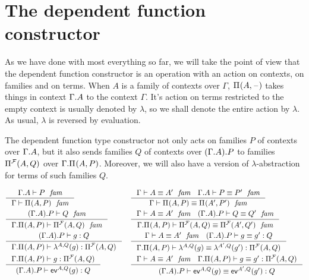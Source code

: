 \section{The dependent function constructor}
As we have done with most everything so far, we will take the point of view that
the dependent function constructor is an operation with an action on contexts,
on families and on terms. When $A$ is a family of contexts over $\Gamma$,
$\mprd{A}{\blank}$ takes things in context $\ctxext{\Gamma}{A}$ to the context
$\Gamma$. It's action on terms restricted to the empty context is usually 
denoted by $\lambda$, so we shall denote the entire action by $\lambda$. As
usual, $\lambda$ is reversed by evaluation. 

The dependent function type constructor not only acts on families $P$ of
contexts over $\ctxext{\Gamma}{A}$, but it also sends families $Q$ of contexts
over $\ctxext{{\Gamma}{A}}{P}$ to families $\mprd[\famsym]{A}{Q}$ over $\ctxext{\Gamma}
{\mprd{A}{P}}$. Moreover, we will also have a version of $\lambda$-abstraction
for terms of such families $Q$.

\begin{align*}
& \inference
    { \jfam{{\Gamma}{A}}{P}
      }
    { \jfam{\Gamma}{\mprd{A}{P}}
      }
& & \inference
      { \jfameq{\Gamma}{A}{A'}
        \jfameq{{\Gamma}{A}}{P}{P'}
        }
      { \jfameq{\Gamma}{\mprd{A}{P}}{\mprd{A'}{P'}}
        }
  \\
& \inference
    { \jfam{{{\Gamma}{A}}{P}}{Q}
      }
    { \jfam{{\Gamma}{\mprd{A}{P}}}{\mprd[\famsym]{A}{Q}}
      }
& & \inference
      { \jfameq{\Gamma}{A}{A'}
        \jfameq{{{\Gamma}{A}}{P}}{Q}{Q'}
        }
      { \jfameq{{\Gamma}{\mprd{A}{P}}}{\mprd[\famsym]{A}{Q}}{\mprd[\famsym]{A'}{Q'}}
        }
  \\
& \inference
    { \jterm{{{\Gamma}{A}}{P}}{Q}{g}
      }
    { \jterm{{\Gamma}{\mprd{A}{P}}}{\mprd[\famsym]{A}{Q}}{\slam{A}{Q}{g}}
      }
& & \inference
      { \jfameq{\Gamma}{A}{A'}
        \jtermeq{{{\Gamma}{A}}{P}}{Q}{g}{g'}
        }
      { \jtermeq{{\Gamma}{\mprd{A}{P}}}{\mprd[\famsym]{A}{Q}}{\slam{A}{Q}{g}}{\slam{A'}{Q}{g'}}
        }
  \\
& \inference
    { \jterm{{\Gamma}{\mprd{A}{P}}}{\mprd[\famsym]{A}{Q}}{g}
      }
    { \jterm{{{\Gamma}{A}}{P}}{Q}{\sev{A}{Q}{g}}
      }
& & \inference
      { \jfameq{\Gamma}{A}{A'}
        \jtermeq{{\Gamma}{\mprd{A}{P}}}{\mprd[\famsym]{A}{Q}}{g}{g'}
        }
      { \jtermeq{{{\Gamma}{A}}{P}}{Q}{\sev{A}{Q}{g}}{\sev{A'}{Q}{g'}}
        }
\end{align*}

